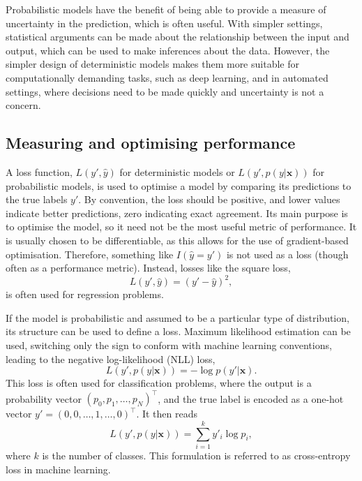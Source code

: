 Probabilistic models have the benefit of being able to provide a measure of uncertainty in the prediction, which is often useful.
With simpler settings, statistical arguments can be made about the relationship between the input and output, which can be used to make inferences about the data.
However, the simpler design of deterministic models makes them more suitable for computationally demanding tasks, such as deep learning, and in automated settings, where decisions need to be made quickly and uncertainty is not a concern.

\subsection{Measuring and optimising performance}
A loss function, $L(y', \hat{y})$ for deterministic models or $L(y', p(y|\bm{x}))$ for probabilistic models, is used to optimise a model by comparing its predictions to the true labels $y'$.
By convention, the loss should be positive, and lower values indicate better predictions, zero indicating exact agreement.
Its main purpose is to optimise the model, so it need not be the most useful metric of performance.
It is usually chosen to be differentiable, as this allows for the use of gradient-based optimisation.
Therefore, something like $I(\hat y = y')$ is not used as a loss (though often as a performance metric).
Instead, losses like the square loss,
\begin{equation}
    L(y', \hat{y}) = (y' - \hat{y})^2,
\end{equation}
is often used for regression problems.

If the model is probabilistic and assumed to be a particular type of distribution, its structure can be used to define a loss.
Maximum likelihood estimation can be used, switching only the sign to conform with machine learning conventions, leading to the negative log-likelihood (NLL) loss,
\begin{equation}
    L(y', p(y|\bm{x})) = -\log p(y'|\bm{x}).
\end{equation}
This loss is often used for classification problems, where the output is a probability vector $(p_0, p_1, \dots, p_N)^\top$, and the true label is encoded as a one-hot vector $y'=(0, 0, \dots, 1, \dots, 0)^\top$.
It then reads
\begin{equation}
    L(y', p(y|\bm{x})) = \sum_{i=1}^k y'_i \log p_i,
\end{equation}
where $k$ is the number of classes.
This formulation is referred to as cross-entropy loss in machine learning.

